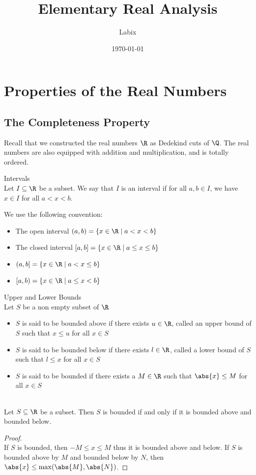 \documentclass[a4paper]{article}
\title{Elementary Real Analysis}
\author{Labix}
\date{\today}
\begin{document}
\maketitle

\pagebreak
\tableofcontents
\pagebreak
\section{Properties of the Real Numbers}
\subsection{The Completeness Property}
Recall that we constructed the real numbers $\R$ as Dedekind cuts of $\Q$. The real numbers are also equipped with addition and multiplication, and is totally ordered. 

\begin{defn}{Intervals}{}\\ Let $I\subseteq\R$ be a subset. We say that $I$ is an interval if for all $a,b\in I$, we have $x\in I$ for all $a<x<b$. 
\end{defn}

We use the following convention: 
\begin{itemize}
\item The open interval $(a,b)=\{x\in\R\;|\;a<x<b\}$
\item The closed interval $[a,b]=\{x\in\R\;|\;a\leq x\leq b\}$
\item $(a,b]=\{x\in\R\;|\;a<x\leq b\}$
\item $[a,b)=\{x\in\R\;|\;a\leq x<b\}$
\end{itemize}

\begin{defn}{Upper and Lower Bounds}{}\\ Let $S$ be a non empty subset of $\R$ 
\begin{itemize}
\item $S$ is said to be bounded above if there exists $u\in\R$, called an upper bound of $S$ such that $x\leq u$ for all $x\in S$
\item $S$ is said to be bounded below if there exists $l\in\R$, called a lower bound of $S$ such that $l\leq x$ for all $x\in S$
\item $S$ is said to be bounded if there exists a $M\in\R$ such that $\abs{x}\leq M$ for all $x\in S$
\end{itemize}
\end{defn}

\begin{lmm}{}{}\\
Let $S\subseteq\R$ be a subset. Then $S$ is bounded if and only if it is bounded above and bounded below. 
\begin{proof}\\ If $S$ is bounded, then $-M\leq x\leq M$ thus it is bounded above and below. If $S$ is bounded above by $M$ and bounded below by $N$, then $\abs{x}\leq\max(\abs{M},\abs{N})$. 
\end{proof}
\end{lmm}
\end{document}
